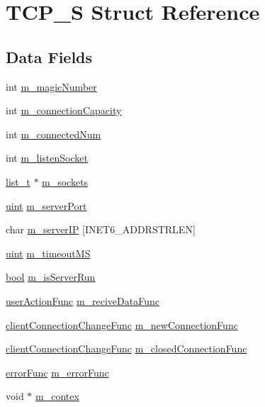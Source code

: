 \hypertarget{structTCP__S}{}\section{T\+C\+P\+\_\+S Struct Reference}
\label{structTCP__S}
\subsection*{Data Fields}
\begin{DoxyCompactItemize}
\item 
int \hyperlink{structTCP__S_affe8822a76f550fd7011539d9c2ce155}{m\+\_\+magic\+Number}
\item 
int \hyperlink{structTCP__S_a77a2c693cfe0dcb321ae26f6cf347ab9}{m\+\_\+connection\+Capacity}
\item 
int \hyperlink{structTCP__S_a0022d3a92a532a6f37c10db899d6cd47}{m\+\_\+connected\+Num}
\item 
int \hyperlink{structTCP__S_a4f0bcd2854168cda93a59f669862ca55}{m\+\_\+listen\+Socket}
\item 
\hyperlink{structlist__t}{list\+\_\+t} $\ast$ \hyperlink{structTCP__S_afb801954f53bf1fb313f029d88652983}{m\+\_\+sockets}
\item 
\hyperlink{tcp_8h_a91ad9478d81a7aaf2593e8d9c3d06a14}{uint} \hyperlink{structTCP__S_ac536669390573b25c18bc10e6c26e574}{m\+\_\+server\+Port}
\item 
char \hyperlink{structTCP__S_a138ef40bec23d2e437f836991c85bf4b}{m\+\_\+server\+IP} \mbox{[}I\+N\+E\+T6\+\_\+\+A\+D\+D\+R\+S\+T\+R\+L\+EN\mbox{]}
\item 
\hyperlink{tcp_8h_a91ad9478d81a7aaf2593e8d9c3d06a14}{uint} \hyperlink{structTCP__S_afc87ad30c304937fd494aa6c93f39801}{m\+\_\+timeout\+MS}
\item 
\hyperlink{whatDownBackEndApp_8c_a1062901a7428fdd9c7f180f5e01ea056}{bool} \hyperlink{structTCP__S_a5f5f617932576fbab6f37206c233145c}{m\+\_\+is\+Server\+Run}
\item 
\hyperlink{tcp_8h_a03acbb6cbffc391f3be83fa353e5f89c}{user\+Action\+Func} \hyperlink{structTCP__S_ab10be5833a35a4ae1a6e3a96547d5c2b}{m\+\_\+recive\+Data\+Func}
\item 
\hyperlink{tcp_8h_a12b172b17797d0f66fd06ef346b5bf30}{client\+Connection\+Change\+Func} \hyperlink{structTCP__S_a56336f3f871b6a2ed804c7d788bc1990}{m\+\_\+new\+Connection\+Func}
\item 
\hyperlink{tcp_8h_a12b172b17797d0f66fd06ef346b5bf30}{client\+Connection\+Change\+Func} \hyperlink{structTCP__S_a31a864e5f7dc9f1c70aee2dd4be25601}{m\+\_\+closed\+Connection\+Func}
\item 
\hyperlink{tcp_8h_a6abfbec9c242e3862442d5d899d8a3bd}{error\+Func} \hyperlink{structTCP__S_ad047d75ba90917949677d9f6af69c017}{m\+\_\+error\+Func}
\item 
void $\ast$ \hyperlink{structTCP__S_a998879b4718153a64a41bc2e4c4e97b8}{m\+\_\+contex}
\end{DoxyCompactItemize}


